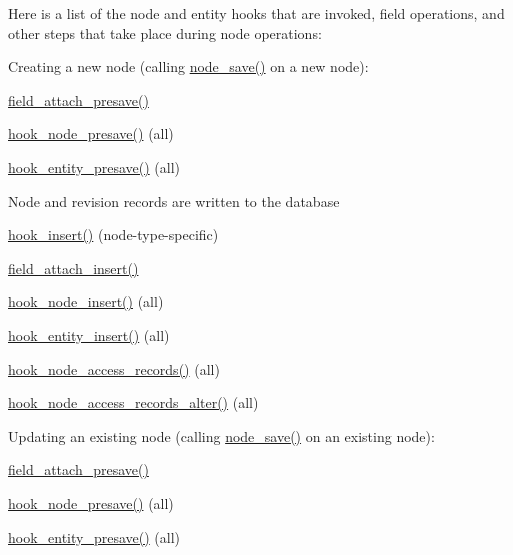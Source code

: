Here is a list of the node and entity hooks that are invoked, field operations, and other steps that take place during node operations:
\begin{DoxyItemize}
\item Creating a new node (calling \hyperlink{node_8module_a26add7591be64b30a18232927ef14faf}{node\_\-save()} on a new node):
\begin{DoxyItemize}
\item \hyperlink{group__field__attach_ga8f3ecf532dc49f8aed138695489fc81d}{field\_\-attach\_\-presave()}
\item \hyperlink{group__node__api__hooks_gab339b1a1ce0e235d4a9c5a05e410dcd6}{hook\_\-node\_\-presave()} (all)
\item \hyperlink{group__hooks_ga1837f8059e89f6b0c00826f3e06e24f7}{hook\_\-entity\_\-presave()} (all)
\item Node and revision records are written to the database
\item \hyperlink{group__node__api__hooks_ga3c6a28d33e07d3506e1eb99718ef4e39}{hook\_\-insert()} (node-\/type-\/specific)
\item \hyperlink{group__field__attach_gad7c37d577b97db5e0c182bc570ed7cf4}{field\_\-attach\_\-insert()}
\item \hyperlink{group__node__api__hooks_ga8b40dc62e46e5055c205d2a723dc3548}{hook\_\-node\_\-insert()} (all)
\item \hyperlink{group__hooks_ga38882255a4252e0e87d77ecd9c75a0dd}{hook\_\-entity\_\-insert()} (all)
\item \hyperlink{group__node__access_ga3fe7744d74446e40e9b9ad2a782b4269}{hook\_\-node\_\-access\_\-records()} (all)
\item \hyperlink{group__node__access_ga37c90bf0e1dccad0deefa368dd94cc83}{hook\_\-node\_\-access\_\-records\_\-alter()} (all)
\end{DoxyItemize}
\item Updating an existing node (calling \hyperlink{node_8module_a26add7591be64b30a18232927ef14faf}{node\_\-save()} on an existing node):
\begin{DoxyItemize}
\item \hyperlink{group__field__attach_ga8f3ecf532dc49f8aed138695489fc81d}{field\_\-attach\_\-presave()}
\item \hyperlink{group__node__api__hooks_gab339b1a1ce0e235d4a9c5a05e410dcd6}{hook\_\-node\_\-presave()} (all)
\item \hyperlink{group__hooks_ga1837f8059e89f6b0c00826f3e06e24f7}{hook\_\-entity\_\-presave()} (all)

\end{DoxyItemize}
\end{DoxyItemize}
